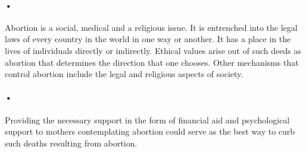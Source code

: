 \documentclass[12pt]{article}
\begin{document}
\paragraph{•}
Abortion is a social, medical and a religious issue. It is entrenched into the legal laws of every country in the world in one way or another. It has a place in the lives of individuals directly or indirectly. Ethical values arise out of such deeds as abortion that determines the direction that one chooses. Other mechanisms that control abortion include the legal and religious aspects of society.
\paragraph{•}
Providing the necessary support in the form of financial aid and psychological support to mothers contemplating abortion could serve as the best way to curb such deaths resulting from abortion.
\end{document}
